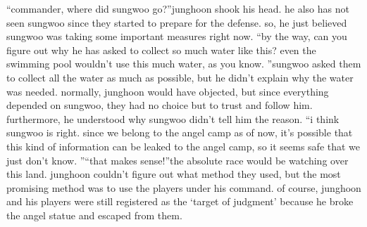 “commander, where did sungwoo go?”junghoon shook his head.
 he also has not seen sungwoo since they started to prepare for the defense.
 so, he just believed sungwoo was taking some important measures right now.
“by the way, can you figure out why he has asked to collect so much water like this? even the swimming pool wouldn’t use this much water, as you know.
”sungwoo asked them to collect all the water as much as possible, but he didn’t explain why the water was needed.
normally, junghoon would have objected, but since everything depended on sungwoo, they had no choice but to trust and follow him.
 furthermore, he understood why sungwoo didn’t tell him the reason.
“i think sungwoo is right.
 since we belong to the angel camp as of now, it’s possible that this kind of information can be leaked to the angel camp, so it seems safe that we just don’t know.
”“that makes sense!”the absolute race would be watching over this land.
 junghoon couldn’t figure out what method they used, but the most promising method was to use the players under his command.
 of course, junghoon and his players were still registered as the ‘target of judgment’ because he broke the angel statue and escaped from them.


